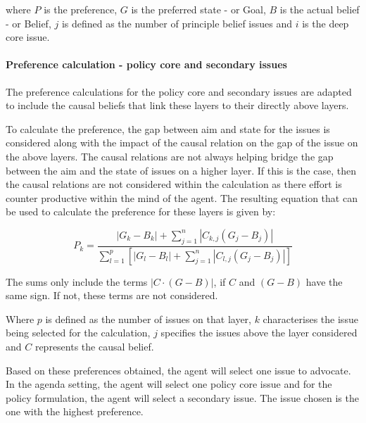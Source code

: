 \documentclass[11pt]{article}
\begin{document}
where $P$ is the preference, $G$ is the preferred state - or Goal, $B$ is the actual belief - or Belief, $j$ is defined as the number of principle belief issues and $i$ is the deep core issue.


\paragraph{Preference calculation - policy core and secondary issues}

The preference calculations for the policy core and secondary issues are adapted to include the causal beliefs that link these layers to their directly above layers.

To calculate the preference, the gap between aim and state for the issues is considered along with the impact of the causal relation on the gap of the issue on the above layers. The causal relations are not always helping bridge the gap between the aim and the state of issues on a higher layer. If this is the case, then the causal relations are not considered within the calculation as there effort is counter productive within the mind of the agent. The resulting equation that can be used to calculate the preference for these layers is given by:

\begin{equation}\label{eq:preference2}
P_k = \frac{ |G_k - B_k| + \sum_{j=1}^n |C_{k,j} \left( G_j - B_j \right)|}{\sum_{l=1}^p \left[ |G_l - B_l| + \sum_{j=1}^n \left|C_{l,j} \left( G_{j} - B_{j} \right) \right| \right]}
\end{equation}

The sums only include the terms $|C \cdot \left( G - B \right)|$, if $C$ and $\left( G - B \right)$ have the same sign. If not, these terms are not considered.

Where $p$ is defined as the number of issues on that layer, $k$ characterises the issue being selected for the calculation, $j$ specifies the issues above the layer considered and $C$ represents the causal belief.

Based on these preferences obtained, the agent will select one issue to advocate. In the agenda setting, the agent will select one policy core issue and for the policy formulation, the agent will select a secondary issue. The issue chosen is the one with the highest preference.

\end{document}
